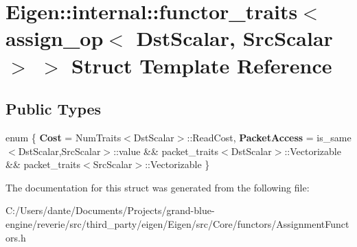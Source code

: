 \hypertarget{struct_eigen_1_1internal_1_1functor__traits_3_01assign__op_3_01_dst_scalar_00_01_src_scalar_01_4_01_4}{}\section{Eigen\+::internal\+::functor\+\_\+traits$<$ assign\+\_\+op$<$ Dst\+Scalar, Src\+Scalar $>$ $>$ Struct Template Reference}
\label{struct_eigen_1_1internal_1_1functor__traits_3_01assign__op_3_01_dst_scalar_00_01_src_scalar_01_4_01_4}
\subsection*{Public Types}
\begin{DoxyCompactItemize}
\item 
\mbox{\label{struct_eigen_1_1internal_1_1functor__traits_3_01assign__op_3_01_dst_scalar_00_01_src_scalar_01_4_01_4_a221a9ca5069efb0920136d02e14e46a5}} 
enum \{ {\bfseries Cost} = Num\+Traits$<$Dst\+Scalar$>$\+::Read\+Cost, 
{\bfseries Packet\+Access} = is\+\_\+same$<$Dst\+Scalar,Src\+Scalar$>$\+::value \&\& packet\+\_\+traits$<$Dst\+Scalar$>$\+::Vectorizable \&\& packet\+\_\+traits$<$Src\+Scalar$>$\+::Vectorizable
 \}
\end{DoxyCompactItemize}


The documentation for this struct was generated from the following file\+:\begin{DoxyCompactItemize}
\item 
C\+:/\+Users/dante/\+Documents/\+Projects/grand-\/blue-\/engine/reverie/src/third\+\_\+party/eigen/\+Eigen/src/\+Core/functors/Assignment\+Functors.\+h\end{DoxyCompactItemize}
